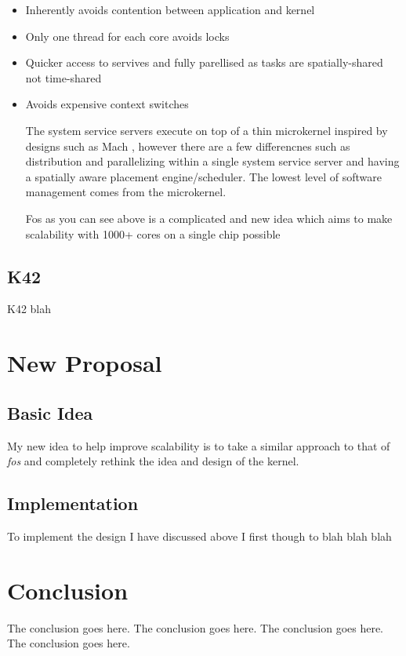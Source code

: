 \documentclass[journal]{IEEEtran}
\begin{document}
\begin{itemize}
\item Inherently avoids contention between application and kernel
\item Only one thread for each core avoids locks
\item Quicker access to servives and fully parellised as tasks are spatially-shared not time-shared
\item Avoids expensive context switches

\vspace{5mm}

The system service servers execute on top of a thin microkernel inspired by designs such as Mach \cite{Mach}, however there are a few differencnes such as distribution and parallelizing within a single system service server and having a spatially aware placement engine/scheduler. The lowest level of software management comes from the microkernel.

Fos as you can see above is a complicated and new idea which aims to make scalability with 1000+ cores on a single chip possible

\end{itemize}

\subsection{K42}
K42 blah

\section{New Proposal}

\subsection{Basic Idea}
My new idea to help improve scalability is to take a similar approach to that of \emph{fos} \cite{fos} and completely rethink the idea and design of the kernel. 

\subsection{Implementation}

To implement the design I have discussed above I first though to blah blah blah

\section{Conclusion}
The conclusion goes here.
The conclusion goes here.
The conclusion goes here.
The conclusion goes here.




\end{document}
